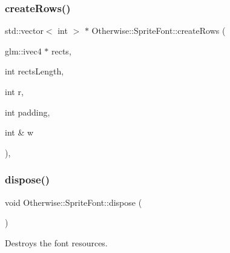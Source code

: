\subsubsection{\texorpdfstring{create\+Rows()}{createRows()}}
{\footnotesize\ttfamily std\+::vector$<$ int $>$ $\ast$ Otherwise\+::\+Sprite\+Font\+::create\+Rows (\begin{DoxyParamCaption}\item[{glm\+::ivec4 $\ast$}]{rects,  }\item[{int}]{rects\+Length,  }\item[{int}]{r,  }\item[{int}]{padding,  }\item[{int \&}]{w }\end{DoxyParamCaption})\hspace{0.3cm}{\ttfamily [static]}, {\ttfamily [private]}}

\mbox{\label{class_otherwise_1_1_sprite_font_a304cfd3e85f149f2f3346cb10cfcbcf9}} 
\subsubsection{\texorpdfstring{dispose()}{dispose()}}
{\footnotesize\ttfamily void Otherwise\+::\+Sprite\+Font\+::dispose (\begin{DoxyParamCaption}{ }\end{DoxyParamCaption})}



Destroys the font resources. 

\mbox{\label{class_otherwise_1_1_sprite_font_a4da78ead7aab2d809008891f126e43fc}} 
